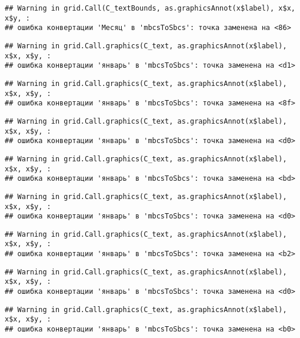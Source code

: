 \documentclass[
]{article}
\begin{document}
\begin{verbatim}
## Warning in grid.Call(C_textBounds, as.graphicsAnnot(x$label), x$x, x$y, :
## ошибка конвертации 'Месяц' в 'mbcsToSbcs': точка заменена на <86>
\end{verbatim}

\begin{verbatim}
## Warning in grid.Call.graphics(C_text, as.graphicsAnnot(x$label), x$x, x$y, :
## ошибка конвертации 'январь' в 'mbcsToSbcs': точка заменена на <d1>
\end{verbatim}

\begin{verbatim}
## Warning in grid.Call.graphics(C_text, as.graphicsAnnot(x$label), x$x, x$y, :
## ошибка конвертации 'январь' в 'mbcsToSbcs': точка заменена на <8f>
\end{verbatim}

\begin{verbatim}
## Warning in grid.Call.graphics(C_text, as.graphicsAnnot(x$label), x$x, x$y, :
## ошибка конвертации 'январь' в 'mbcsToSbcs': точка заменена на <d0>
\end{verbatim}

\begin{verbatim}
## Warning in grid.Call.graphics(C_text, as.graphicsAnnot(x$label), x$x, x$y, :
## ошибка конвертации 'январь' в 'mbcsToSbcs': точка заменена на <bd>
\end{verbatim}

\begin{verbatim}
## Warning in grid.Call.graphics(C_text, as.graphicsAnnot(x$label), x$x, x$y, :
## ошибка конвертации 'январь' в 'mbcsToSbcs': точка заменена на <d0>
\end{verbatim}

\begin{verbatim}
## Warning in grid.Call.graphics(C_text, as.graphicsAnnot(x$label), x$x, x$y, :
## ошибка конвертации 'январь' в 'mbcsToSbcs': точка заменена на <b2>
\end{verbatim}

\begin{verbatim}
## Warning in grid.Call.graphics(C_text, as.graphicsAnnot(x$label), x$x, x$y, :
## ошибка конвертации 'январь' в 'mbcsToSbcs': точка заменена на <d0>
\end{verbatim}

\begin{verbatim}
## Warning in grid.Call.graphics(C_text, as.graphicsAnnot(x$label), x$x, x$y, :
## ошибка конвертации 'январь' в 'mbcsToSbcs': точка заменена на <b0>
\end{verbatim}
\end{document}
